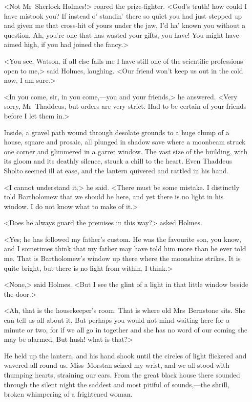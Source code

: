 <Not Mr~Sherlock Holmes!> roared the prize-fighter. <God's truth! how could I have mistook you? If instead o' standin' there so quiet you had just stepped up and given me that cross-hit of yours under the jaw, I'd ha' known you without a question. Ah, you're one that has wasted your gifts, you have! You might have aimed high, if you had joined the fancy.>

<You see, Watson, if all else fails me I have still one of the scientific professions open to me,> said Holmes, laughing. <Our friend won't keep us out in the cold now, I am sure.>

<In you come, sir, in you come,—you and your friends,> he answered. <Very sorry, Mr~Thaddeus, but orders are very strict. Had to be certain of your friends before I let them in.>

Inside, a gravel path wound through desolate grounds to a huge clump of a house, square and prosaic, all plunged in shadow save where a moonbeam struck one corner and glimmered in a garret window. The vast size of the building, with its gloom and its deathly silence, struck a chill to the heart. Even Thaddeus Sholto seemed ill at ease, and the lantern quivered and rattled in his hand.

<I cannot understand it,> he said. <There must be some mistake. I distinctly told Bartholomew that we should be here, and yet there is no light in his window. I do not know what to make of it.>

<Does he always guard the premises in this way?> asked Holmes.

<Yes; he has followed my father's custom. He was the favourite son, you know, and I sometimes think that my father may have told him more than he ever told me. That is Bartholomew's window up there where the moonshine strikes. It is quite bright, but there is no light from within, I think.>

<None,> said Holmes. <But I see the glint of a light in that little window beside the door.>

<Ah, that is the housekeeper's room. That is where old Mrs~Bernstone sits. She can tell us all about it. But perhaps you would not mind waiting here for a minute or two, for if we all go in together and she has no word of our coming she may be alarmed. But hush! what is that?>

He held up the lantern, and his hand shook until the circles of light flickered and wavered all round us. Miss~Morstan seized my wrist, and we all stood with thumping hearts, straining our ears. From the great black house there sounded through the silent night the saddest and most pitiful of sounds,—the shrill, broken whimpering of a frightened woman.

